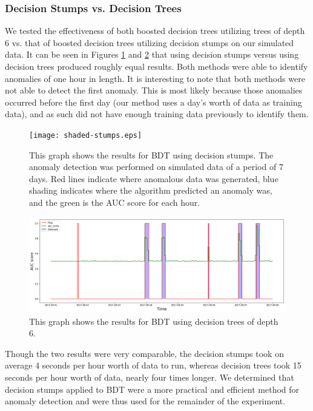 \documentclass[5p]{elsarticle}
\begin{document}
\subsubsection{Decision Stumps vs. Decision Trees}

We tested the effectiveness of both boosted decision trees utilizing trees of depth 6 vs. that of boosted decision trees utilizing decision stumps on our simulated data. It can be seen in Figures \ref{fig:shaded} and \ref{fig:shaded-tree} that using decision stumps versus using decision trees produced roughly equal results. Both methods were able to identify anomalies of one hour in length. It is interesting to note that both methods were not able to detect the first anomaly. This is most likely because those anomalies occurred before the first day (our method uses a day’s worth of data as training data), and as such did not have enough training data previously to identify them. 

\begin{figure}[htbp]
    \centering
    \texttt{[image: shaded-stumps.eps]}
    \caption{This graph shows the results for BDT using decision stumps. The anomaly detection was performed on simulated data of a period of 7 days. Red lines indicate where anomalous data was generated, blue shading indicates where the algorithm predicted an anomaly was, and the green is the AUC score for each hour.}
    \label{fig:shaded}
\end{figure}

\begin{figure}[htbp]
    \centering
    \includegraphics[width=\linewidth]{shaded-tree.png}
    \caption{This graph shows the results for BDT using decision trees of depth 6.}
    \label{fig:shaded-tree}
\end{figure}

Though the two results were very comparable, the decision stumps took on average 4 seconds per hour worth of data to run, whereas decision trees took 15 seconds per hour worth of data, nearly four times longer. We determined that decision stumps applied to BDT were a more practical and efficient method for anomaly detection and were thus used for the remainder of the experiment.
\end{document}
